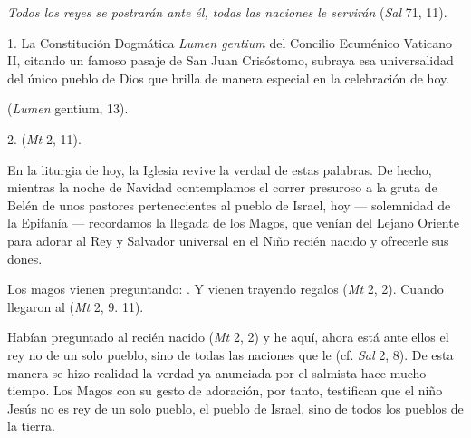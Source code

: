 				\begin{body}
					\emph{Todos los reyes se postrarán ante él, todas las naciones le servirán} (\emph{Sal} 71, 11).
					
					1. La Constitución Dogmática \emph{Lumen gentium} del Concilio Ecuménico Vaticano II, citando un famoso pasaje de San Juan Crisóstomo, subraya esa universalidad del único pueblo de Dios que brilla de manera especial en la celebración de hoy.
					
					 (\emph{Lumen} gentium, 13).
					
					2.  (\emph{Mt} 2, 11).
					
					En la liturgia de hoy, la Iglesia revive la verdad de estas palabras. De hecho, mientras la noche de Navidad contemplamos el correr presuroso a la gruta de Belén de unos pastores pertenecientes al pueblo de Israel, hoy --- solemnidad de la Epifanía --- recordamos la llegada de los Magos, que venían del Lejano Oriente para adorar al Rey y Salvador universal en el Niño recién nacido y ofrecerle sus dones.
					
					Los magos vienen preguntando: . Y vienen trayendo regalos (\emph{Mt} 2, 2). Cuando llegaron al  (\emph{Mt} 2, 9. 11).
					
					Habían preguntado al recién nacido  (\emph{Mt} 2, 2) y he aquí, ahora está ante ellos el rey no de un solo pueblo, sino de todas las naciones que le  (cf. \emph{Sal} 2, 8). De esta manera se hizo realidad la verdad ya anunciada por el salmista hace mucho tiempo. Los Magos con su gesto de adoración, por tanto, testifican que el niño Jesús no es rey de un solo pueblo, el pueblo de Israel, sino de todos los pueblos de la tierra.
					

\end{body}

